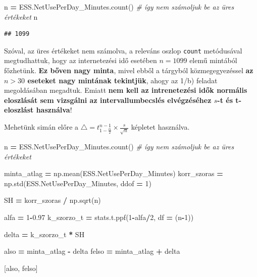 \documentclass[
]{book}
\newenvironment{Shaded}{\begin{snugshade}}{\end{snugshade}}
\newcommand{\CommentTok}[1]{\textcolor[rgb]{0.56,0.35,0.01}{\textit{#1}}}
\newcommand{\DecValTok}[1]{\textcolor[rgb]{0.00,0.00,0.81}{#1}}
\newcommand{\FloatTok}[1]{\textcolor[rgb]{0.00,0.00,0.81}{#1}}
\newcommand{\NormalTok}[1]{#1}
\newcommand{\OperatorTok}[1]{\textcolor[rgb]{0.81,0.36,0.00}{\textbf{#1}}}
\begin{document}
\begin{Shaded}
\begin{Highlighting}[]
\NormalTok{n }\OperatorTok{=}\NormalTok{ ESS.NetUsePerDay\_Minutes.count() }\CommentTok{\# így nem számoljuk be az üres értékeket}
\NormalTok{n}
\end{Highlighting}
\end{Shaded}

\begin{verbatim}
## 1099
\end{verbatim}

Szóval, az üres értékeket nem számolva, a releváns oszlop \texttt{count} metódusával megtudhattuk, hogy az internetezési idő esetében \(n=1099\) elemű mintából főzhetünk. \textbf{Ez bőven nagy minta}, mivel ebből a tárgyból közmegegyezéssel \textbf{az \(n > 30\) eseteket nagy mintának tekintjük}, ahogy az 1/b) feladat megoldásában megadtuk. Emiatt \textbf{nem kell az intrenetezési idők normális eloszlását sem vizsgálni az intervallumbecslés elvégzéséhez \(s\)-t és t-eloszlást használva}!

Mehetünk simán előre a \(\triangle = t_{1-\frac{\alpha}{2}}^{n-1} \times \frac{s}{\sqrt{n}}\) képletet használva.

\begin{Shaded}
\begin{Highlighting}[]
\NormalTok{n }\OperatorTok{=}\NormalTok{ ESS.NetUsePerDay\_Minutes.count() }\CommentTok{\# így nem számoljuk be az üres értékeket}

\NormalTok{minta\_atlag }\OperatorTok{=}\NormalTok{ np.mean(ESS.NetUsePerDay\_Minutes)}
\NormalTok{korr\_szoras }\OperatorTok{=}\NormalTok{ np.std(ESS.NetUsePerDay\_Minutes, ddof }\OperatorTok{=} \DecValTok{1}\NormalTok{)}

\NormalTok{SH }\OperatorTok{=}\NormalTok{ korr\_szoras }\OperatorTok{/}\NormalTok{ np.sqrt(n)}

\NormalTok{alfa }\OperatorTok{=} \DecValTok{1}\OperatorTok{{-}}\FloatTok{0.97}
\NormalTok{k\_szorzo\_t }\OperatorTok{=}\NormalTok{ stats.t.ppf(}\DecValTok{1}\OperatorTok{{-}}\NormalTok{alfa}\OperatorTok{/}\DecValTok{2}\NormalTok{, df }\OperatorTok{=}\NormalTok{ (n}\OperatorTok{{-}}\DecValTok{1}\NormalTok{))}

\NormalTok{delta }\OperatorTok{=}\NormalTok{ k\_szorzo\_t }\OperatorTok{*}\NormalTok{ SH}

\NormalTok{also }\OperatorTok{=}\NormalTok{ minta\_atlag }\OperatorTok{{-}}\NormalTok{ delta}
\NormalTok{felso }\OperatorTok{=}\NormalTok{ minta\_atlag }\OperatorTok{+}\NormalTok{ delta}

\NormalTok{[also, felso]}
\end{Highlighting}
\end{Shaded}
\end{document}
